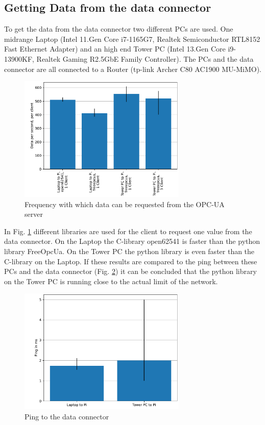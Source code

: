 \documentclass[conference]{IEEEtran}
\begin{document}
\subsection{Getting Data from the data connector}
To get the data from the data connector two different PCs are used. One midrange Laptop (Intel 11.Gen Core i7-1165G7, Realtek Semiconductor
RTL8152 Fast Ethernet Adapter) and an high end Tower PC (Intel 13.Gen Core i9-13900KF, Realtek Gaming R2.5GbE Family Controller).
The PCs and the data connector are all connected to a Router (tp-link Archer C80 AC1900 MU-MiMO).\\
\begin{figure}[htbp]
    \centerline{\includegraphics[width=8cm]{Pictures/OPCUASpeed1D.pdf}}
    \caption{Frequency with which data can be requested from the OPC-UA server}
    \label{fig:OPCUASpeed1D}
\end{figure}
In Fig. \ref{fig:OPCUASpeed1D} different libraries are used for the client to request one value from the data connector.
On the Laptop the C-library open62541 is faster than the python library FreeOpcUa.
On the Tower PC the python library is even faster than the C-library on the Laptop.
If these results are compared to the ping between these PCs and the data connector (Fig. \ref{fig:PingDiagram}) it can be concluded that the python library on the Tower PC is running close to the actual limit of the network.\\
\begin{figure}[htbp]
    \centerline{\includegraphics[width=8cm]{Pictures/PingDiagram.pdf}}
    \caption{Ping to the data connector}
    \label{fig:PingDiagram}
\end{figure}
\end{document}
